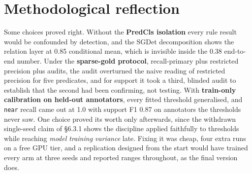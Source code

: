 \section{Methodological reflection}

Some choices proved right. Without the \textbf{PredCls isolation} every rule result would be confounded by detection, and the SGDet decomposition shows the relation layer at 0.85 conditional mean, which is invisible inside the 0.38 end-to-end number. Under the \textbf{sparse-gold protocol}, recall-primary plus restricted precision plus audits, the audit overturned the naive reading of restricted precision for five predicates, and for support it took a third, blinded audit to establish that the second had been confirming, not testing. With \textbf{train-only calibration on held-out annotators}, every fitted threshold generalised, and \texttt{near} recall came out at 1.0 with support F1 0.87 on annotators the thresholds never saw. One choice proved its worth only afterwards, since the withdrawn single-seed claim of \S{}6.3.1 shows the discipline applied faithfully to thresholds while reaching \textit{model training variance} late. Fixing it was cheap, four extra runs on a free GPU tier, and a replication designed from the start would have trained every arm at three seeds and reported ranges throughout, as the final version does.

